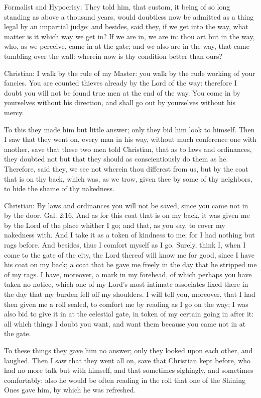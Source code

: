 Formalist and Hypocrisy: They told him, that custom, it being of so long standing as above a thousand years, would doubtless now be admitted as a thing legal by an impartial judge: and besides, said they, if we get into the way, what matter is it which way we get in? If we are in, we are in: thou art but in the way, who, as we perceive, came in at the gate; and we also are in the way, that came tumbling over the wall: wherein now is thy condition better than ours?

Christian: I walk by the rule of my Master: you walk by the rude working of your fancies. You are counted thieves already by the Lord of the way: therefore I doubt you will not be found true men at the end of the way. You come in by yourselves without his direction, and shall go out by yourselves without his mercy.

To this they made him but little answer; only they bid him look to himself. Then I saw that they went on, every man in his way, without much conference one with another, save that these two men told Christian, that as to laws and ordinances, they doubted not but that they should as conscientiously do them as he. Therefore, said they, we see not wherein thou differest from us, but by the coat that is on thy back, which was, as we trow, given thee by some of thy neighbors, to hide the shame of thy nakedness.

Christian: By laws and ordinances you will not be saved, since you came not in by the door. Gal. 2:16. And as for this coat that is on my back, it was given me by the Lord of the place whither I go; and that, as you say, to cover my nakedness with. And I take it as a token of kindness to me; for I had nothing but rags before. And besides, thus I comfort myself as I go. Surely, think I, when I come to the gate of the city, the Lord thereof will know me for good, since I have his coat on my back; a coat that he gave me freely in the day that he stripped me of my rags. I have, moreover, a mark in my forehead, of which perhaps you have taken no notice, which one of my Lord's most intimate associates fixed there in the day that my burden fell off my shoulders. I will tell you, moreover, that I had then given me a roll sealed, to comfort me by reading as I go on the way; I was also bid to give it in at the celestial gate, in token of my certain going in after it: all which things I doubt you want, and want them because you came not in at the gate.

To these things they gave him no answer; only they looked upon each other, and laughed. Then I saw that they went all on, save that Christian kept before, who had no more talk but with himself, and that sometimes sighingly, and sometimes comfortably: also he would be often reading in the roll that one of the Shining Ones gave him, by which he was refreshed.

